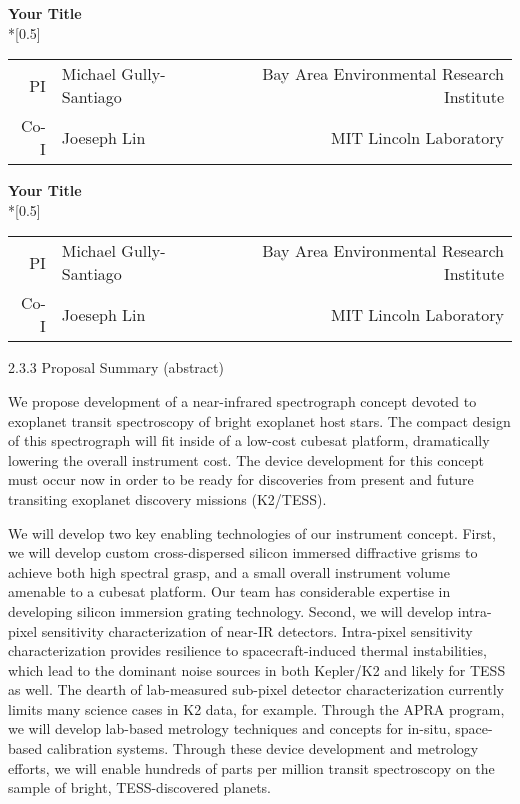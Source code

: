 \documentclass[12pt]{article}
\makeatletter
\renewcommand*{\maketitle}{
\begin{center}
  \begingroup
  \Large
  \textbf{Your Title} \\*[0.5\baselineskip]
  \normalsize
\begin{tabular}{r@{:\quad}lr}
          PI & Michael Gully-Santiago       & Bay Area Environmental Research Institute       \\
        Co-I & Joeseph Lin & MIT Lincoln Laboratory
\end{tabular}
  \endgroup
\end{center}
}
\makeatother
\begin{document}
\raggedbottom
\fontsize{12}{16}\selectfont



\maketitle

\tableofcontents



\clearpage


\maketitle

2.3.3 Proposal Summary (abstract)

We propose development of a near-infrared spectrograph concept devoted to exoplanet transit spectroscopy of bright exoplanet host stars.  The compact design of this spectrograph will fit inside of a low-cost cubesat platform, dramatically lowering the overall instrument cost. The device development for this concept must occur now in order to be ready for discoveries from present and future transiting exoplanet discovery missions (K2/TESS).

We will develop two key enabling technologies of our instrument concept.  First, we will develop custom cross-dispersed silicon immersed diffractive grisms to achieve both high spectral grasp, and a small overall instrument volume amenable to a cubesat platform.  Our team has considerable expertise in developing silicon immersion grating technology.  Second, we will develop intra-pixel sensitivity characterization of near-IR detectors.  Intra-pixel sensitivity characterization provides resilience to spacecraft-induced thermal instabilities, which lead to the dominant noise sources in both Kepler/K2 and likely for TESS as well.  The dearth of lab-measured sub-pixel detector characterization currently limits many science cases in K2 data, for example.  Through the APRA program, we will develop lab-based metrology techniques and concepts for in-situ, space-based calibration systems.  Through these device development and metrology efforts, we will enable hundreds of parts per million transit spectroscopy on the sample of bright, TESS-discovered planets.
\end{document}

